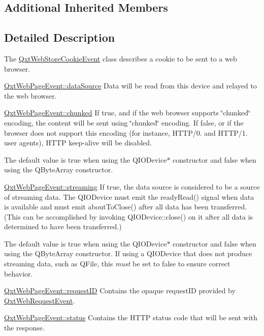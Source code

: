 \subsection*{Additional Inherited Members}


\subsection{Detailed Description}
The \hyperlink{class_qxt_web_store_cookie_event}{Qxt\-Web\-Store\-Cookie\-Event} class describes a cookie to be sent to a web browser. 

\hyperlink{class_qxt_web_page_event_ae348a623f5b063e3dfa79ad4faf8ffd6}{Qxt\-Web\-Page\-Event\-::data\-Source} Data will be read from this device and relayed to the web browser.

\hyperlink{class_qxt_web_page_event_a06310e86eecb41b64ea256acd0e0ff3b}{Qxt\-Web\-Page\-Event\-::chunked} If true, and if the web browser supports \char`\"{}chunked\char`\"{} encoding, the content will be sent using \char`\"{}chunked\char`\"{} encoding. If false, or if the browser does not support this encoding (for instance, H\-T\-T\-P/0. and H\-T\-T\-P/1. user agents), H\-T\-T\-P keep-\/alive will be disabled.

The default value is true when using the Q\-I\-O\-Device$\ast$ constructor and false when using the Q\-Byte\-Array constructor.

\hyperlink{class_qxt_web_page_event_a7e523943475e8db70ddadc3b6303fe34}{Qxt\-Web\-Page\-Event\-::streaming} If true, the data source is considered to be a source of streaming data. The Q\-I\-O\-Device must emit the ready\-Read() signal when data is available and must emit about\-To\-Close() after all data has been transferred. (This can be accomplished by invoking Q\-I\-O\-Device\-::close() on it after all data is determined to have been transferred.)

The default value is true when using the Q\-I\-O\-Device$\ast$ constructor and false when using the Q\-Byte\-Array constructor. If using a Q\-I\-O\-Device that does not produce streaming data, such as Q\-File, this {\itshape must} be set to false to ensure correct behavior.

\hyperlink{class_qxt_web_page_event_a144c8010cc1c9d239bf5de4c72d09f7a}{Qxt\-Web\-Page\-Event\-::request\-I\-D} Contains the opaque request\-I\-D provided by \hyperlink{class_qxt_web_request_event}{Qxt\-Web\-Request\-Event}.

\hyperlink{class_qxt_web_page_event_a3faa95fe00502400daa87a3a88e50d86}{Qxt\-Web\-Page\-Event\-::status} Contains the H\-T\-T\-P status code that will be sent with the response.

